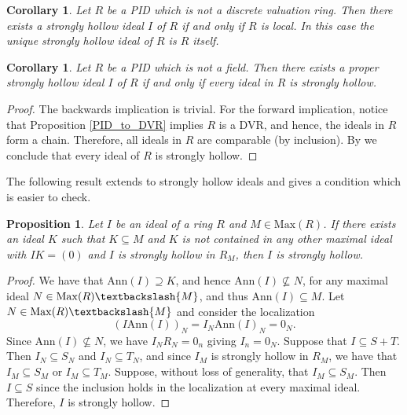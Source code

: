 \documentclass[11pt,english]{amsart}
\newtheorem{proposition}[theorem]{Proposition}
\newtheorem{corollary}[theorem]{Corollary}
\theoremstyle{definition}
\numberwithin{equation}{section}
\theoremstyle{remark}
\begin{document}
\begin{corollary}
    Let $R$ be a PID which is not a discrete valuation ring. Then there exists a strongly hollow ideal $I$ of $R$ if and only if  $R$ is local. In this case the unique strongly hollow ideal of $R$ is $R$ itself.
\end{corollary}

\begin{corollary}
    Let $R$ be a PID which is not a field. Then there exists a proper strongly hollow ideal $I$ of $R$ if and only if every ideal in $R$ is strongly hollow.
\end{corollary}

\begin{proof}
    The backwards implication is trivial. For the forward implication, notice that Proposition \ref{PID_to_DVR} implies  $R$ is a DVR, and hence, the ideals in $R$ form a chain. Therefore, all ideals in $R$ are comparable (by inclusion). By \cite[Theorem.~2.5]{Rostami2021} we conclude that every ideal of $R$ is strongly hollow.
\end{proof}

The following result extends \cite[Proposition~1.24]{Rostami2021} to strongly hollow ideals and gives a condition which is easier to check.

\begin{proposition}\label{ann_condition}
    Let $I$ be an ideal of a ring $R$ and $M\in \mathrm{Max}(R)$. If there exists an ideal $K$ such that $K\subseteq M$ and $K$ is not contained in any other maximal ideal with $IK=(0)$ and $I$ is strongly hollow in $R_M$, then $I$ is strongly hollow. 
\end{proposition}

\begin{proof}
    We have that $\mathrm{Ann}(I)\supseteq K$, and hence $\mathrm{Ann}(I)\not\subseteq N$, for any maximal ideal $N\in\mathrm{Max}(R)\textbackslash\{M\}$, and thus $\mathrm{Ann}(I)\subseteq M$. Let $N\in\mathrm{Max}(R)\textbackslash\{M\}$ and consider the localization \[(I\mathrm{Ann}(I))_N=I_N\mathrm{Ann}(I)_N=0_N.\] Since $\mathrm{Ann}(I)\not\subseteq N$, we have $I_NR_N=0_n$ giving $I_n=0_N$. Suppose that $I\subseteq S+T$. Then $I_N\subseteq S_N$ and $I_N\subseteq T_N$, and since $I_M$ is strongly hollow in $R_M$, we have that $I_M\subseteq S_M$ or $I_M\subseteq T_M$. Suppose, without loss of generality, that $I_M\subseteq S_M$. Then $I\subseteq S$ since the inclusion holds in the localization at every maximal ideal. Therefore, $I$ is strongly hollow.
\end{proof}
\end{document}
